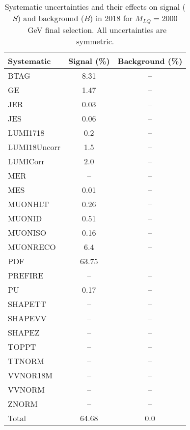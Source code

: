 \begin{table}[htbp]
\begin{center}
\caption{Systematic uncertainties and their effects on signal ($S$) and background ($B$) in 2018 for $M_{LQ}=2000$~GeV final selection. All uncertainties are symmetric.}
\begin{tabular}{lcc}
\hline\hline
Systematic & Signal (\%) & Background (\%) \\ \hline 
BTAG & 8.31 & --\\ 
GE & 1.47 & --\\ 
JER & 0.03 & --\\ 
JES & 0.06 & --\\ 
LUMI1718 & 0.2 & --\\ 
LUMI18Uncorr & 1.5 & --\\ 
LUMICorr & 2.0 & --\\ 
MER & -- & --\\ 
MES & 0.01 & --\\ 
MUONHLT & 0.26 & --\\ 
MUONID & 0.51 & --\\ 
MUONISO & 0.16 & --\\ 
MUONRECO & 6.4 & --\\ 
PDF & 63.75 & --\\ 
PREFIRE & -- & --\\ 
PU & 0.17 & --\\ 
SHAPETT & -- & --\\ 
SHAPEVV & -- & --\\ 
SHAPEZ & -- & --\\ 
TOPPT & -- & --\\ 
TTNORM & -- & --\\ 
VVNOR18M & -- & --\\ 
VVNORM & -- & --\\ 
ZNORM & -- & --\\ 
Total & 64.68 & 0.0\\ \hline \hline
\end{tabular}
\label{tab:SysUncertainties_uujj_2000}
\end{center}
\end{table}


